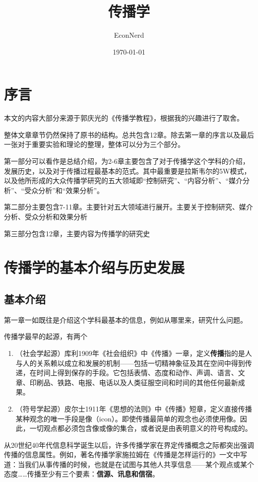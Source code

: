 \documentclass[UTF8,12pt]{ctexart}
\title{传播学} %
\author{EconNerd}
\date{\today}
\numberwithin{equation}{section} %
\numberwithin{figure}{section}
\numberwithin{table}{section}
\begin{document}
	\maketitle
	\tableofcontents
	\newpage
	
	\section{序言}
	本文的内容大部分来源于郭庆光的《传播学教程》，根据我的兴趣进行了取舍。
	
	整体文章章节仍然保持了原书的结构。总共包含12章。除去第一章的序言以及最后一张对于重要实验和理论的整理，整体可以分为三个部分。
	
	第一部分可以看作是总结介绍，为2-6章主要包含了对于传播学这个学科的介绍，发展历史，以及对于传播过程最基本的范式。其中最重要是拉斯韦尔的5W模式，以及他所形成的大众传播学研究的五大领域即“控制研究”、“内容分析”、“媒介分析”、“受众分析”和“效果分析”。
	
	第二部分主要包含7-11章。主要针对五大领域进行展开。主要关于控制研究、媒介分析、受众分析和效果分析
	
	第三部分包含12章，主要内容为传播学的研究史
	
	\newpage
	
	\section{传播学的基本介绍与历史发展}
	\subsection{基本介绍}
	第一章一如既往是介绍这个学科最基本的信息，例如从哪里来，研究什么问题。
	
	传播学最早的起源，有两个
	\begin{enumerate}
		\item （社会学起源）库利1909年《社会组织》中《传播》一章，定义\textbf{传播}指的是人与人的关系赖以成立和发展的机制——包括一切精神象征及其在空间中得到传递，在时间上得到保存的手段。它包括表情、态度和动作、声调、语言、文章、印刷品、铁路、电报、电话以及人类征服空间和时间的其他任何最新成果。
		
		\item （符号学起源）皮尔士1911年《思想的法则》中《传播》短章，定义直接传播某种观念的唯一手段是像（icon）。即使传播最简单的观念也必须使用像。因此，一切观点都必须包含像或像的集合，或者说是由表明意义的符号构成的。
	\end{enumerate}
	
	从20世纪40年代信息科学诞生以后，许多传播学家在界定传播概念之际都突出强调传播的信息属性。例如，著名传播学家施拉姆在《传播是怎样运行的》一文中写道：当我们从事传播的时候，也就是在试图与其他人共享信息——某个观点或某个态度……传播至少有三个要素：\textbf{信源、讯息和信宿}。
	
\end{document}

